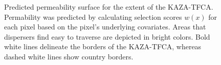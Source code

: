 \documentclass[abstract=on,10pt,a4paper,bibliography=totocnumbered]{scrartcl}
\begin{document}
\begin{figure}[hbtp]
  \begin{center}
    \caption{Predicted permeability surface for the extent of the KAZA-TFCA.
    Permability was predicted by calculating selection scores \(w(x)\) for each
    pixel based on the pixel's underlying covariates. Areas that dispersers find
    easy to traverse are depicted in bright colors. Bold white lines delineate
    the borders of the KAZA-TFCA, whereas dashed white lines show country
    borders.}
    \label{PermeabilityMap}
  \end{center}
\end{figure}
\end{document}
